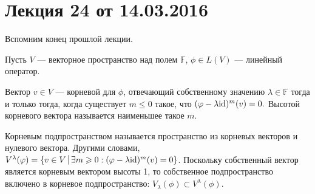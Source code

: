 


\def\limref#1#2{{#1}\negmedspace\mid_{#2}}

\section{Лекция 24 от 14.03.2016}

Вспомним конец прошлой лекции.

Пусть $V$ --- векторное пространство над полем $\mathbb{F}$, $\phi \in L(V)$ --- линейный оператор.

Вектор $v \in V$ --- корневой для $\phi$, отвечающий собственному значению $\lambda \in \mathbb{F}$ тогда и только тогда, когда существует $m \leqslant 0 $ такое, что $(\varphi - \lambda \mathrm{id})^{m}(v) = 0.$ Высотой корневого вектора называется наименьшее такое $m$.

Корневым подпространством называется пространство из корневых векторов и нулевого вектора. Другими словами, $V^{\lambda}(\phi) = \{v \in V \; \vline \; \exists m \geqslant 0 : (\phi - \lambda \id)^{m}(v) = 0\}$. Поскольку собственный вектор является корневым вектором высоты 1, то собственное подпространство включено в корневое подпространство: $V_{\lambda}(\phi) \subset V^{\lambda}(\phi).$

